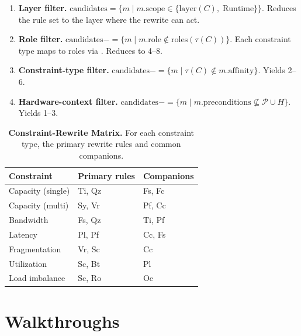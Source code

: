 \documentclass[10pt,twocolumn]{article}
\newcommand{\tablebody}{\footnotesize}
\begin{document}
\begin{enumerate}[nosep, leftmargin=*]
\item \textbf{Layer filter.} $\text{candidates} = \{m \mid m.\text{scope} \in \{\text{layer}(C),\; \text{Runtime}\}\}$. Reduces the rule set to the layer where the rewrite can act.

\item \textbf{Role filter.} $\text{candidates} \mathrel{{-}{=}} \{m \mid m.\text{role} \notin \text{roles}(\tau(C))\}$. Each constraint type maps to roles via . Reduces to 4--8.

\item \textbf{Constraint-type filter.} $\text{candidates} \mathrel{{-}{=}} \{m \mid \tau(C) \notin m.\text{affinity}\}$. Yields 2--6.

\item \textbf{Hardware-context filter.} $\text{candidates} \mathrel{{-}{=}} \{m \mid m.\text{preconditions} \not\subseteq \mathcal{P} \cup H\}$. Yields 1--3.
\end{enumerate}

\begin{table}[t]
\tablebody
\centering
\caption{\textbf{Constraint-Rewrite Matrix.} For each constraint type, the primary rewrite rules and common companions.}
\label{tab:resolution-matrix}
\begin{tabularx}{\columnwidth}{@{} l l X @{}}
\toprule
\textbf{Constraint} & \textbf{Primary rules} & \textbf{Companions} \\
\midrule
Capacity (single) & Ti, Qz & Fs, Fc \\
Capacity (multi)  & Sy, Vr & Pf, Cc \\
Bandwidth         & Fs, Qz & Ti, Pf \\
Latency           & Pl, Pf & Cc, Fs \\
Fragmentation     & Vr, Sc & Cc \\
Utilization       & Sc, Bt & Pl \\
Load imbalance    & Sc, Ro & Oc \\
\bottomrule
\end{tabularx}
\end{table}

\section{Walkthroughs}
\label{sec:walkthrough}
\end{document}
